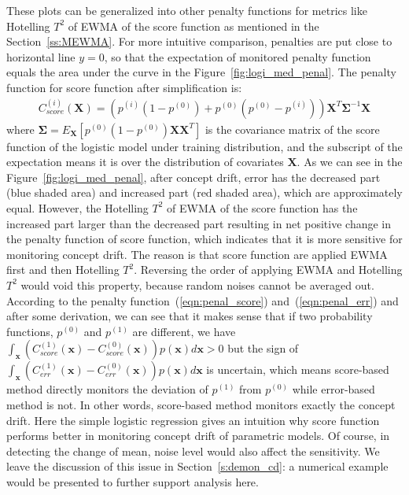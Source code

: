 \documentclass[twoside,11pt]{article}
\begin{document}
These plots can be generalized into other penalty functions for metrics like Hotelling $T^2$ of EWMA of the score function as mentioned in the Section~\ref{ss:MEWMA}. For more intuitive comparison, penalties are put close to horizontal line $y=0$, so that the expectation of monitored penalty function equals the area under the curve in the Figure~\ref{fig:logi_med_penal}.
The penalty function for score function after simplification is:
\begin{align}
C _{score}^{(i)}(\bm {X}) = (p ^{(i)} (1 - p ^{(0)}) + p ^{(0)}(p ^{(0)}-p ^{(i)})) \bm {X}^T\bm { \Sigma}^{-1}\bm {X}
\label{eqn:penal_score}
\end{align}
where $\bm { \Sigma} = E _{\bm {X}}[p ^{(0)}(1-p ^{(0)})\bm {X}\bm {X}^T]$ is the covariance matrix of the score function of the logistic model under training distribution, and the subscript of the expectation means it is over the distribution of covariates $\bm {X}$. As we can see in the Figure~\ref{fig:logi_med_penal}, after concept drift, error has the decreased part (blue shaded area) and increased part (red shaded area), which are approximately equal. However, the Hotelling $T^2$ of EWMA of the score function has the increased part larger than the decreased part resulting in net positive change in the penalty function of score function, which indicates that it is more sensitive for monitoring concept drift. The reason is that score function are applied EWMA first and then Hotelling $T^2$. Reversing the order of applying EWMA and Hotelling $T^2$ would void this property, because random noises cannot be averaged out. According to the penalty function~(\ref{eqn:penal_score}) and~(\ref{eqn:penal_err}) and after some derivation, we can see that it makes sense that if two probability functions, $p ^{(0)}$ and $p ^{(1)}$ are different, we have $\int_{\bm{x}}(C _{score}^{(1)}(\bm {x})-C _{score}^{(0)}(\bm {x}))p(\bm{x})d\bm{x}>0$ but the sign of $\int_{\bm{x}}(C _{err}^{(1)}(\bm {x})-C _{err}^{(0)}(\bm {x}))p(\bm{x})d\bm{x}$ is uncertain, which means score-based method directly monitors the deviation of $p ^{(1)}$ from $p ^{(0)}$ while error-based method is not. In other words, score-based method monitors exactly the concept drift. Here the simple logistic regression gives an intuition why score function performs better in monitoring concept drift of parametric models. Of course, in detecting the change of mean, noise level would also affect the sensitivity. We leave the discussion of this issue in Section~\ref{s:demon_cd}: a numerical example would be presented to further support analysis here.
\end{document}
